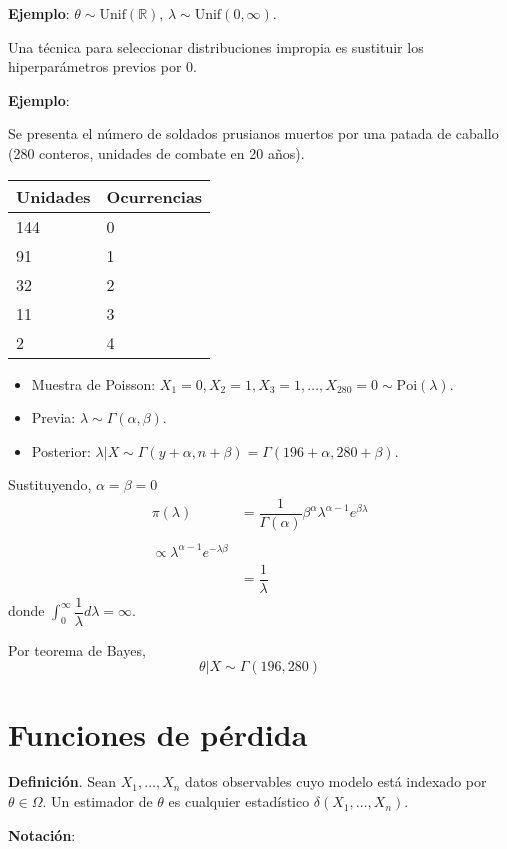 \documentclass[
  12pt,
]{book}
\begin{document}
\textbf{Ejemplo}: \(\theta \sim \text{Unif}(\mathbb{R})\), \(\lambda \sim \text{Unif}(0,\infty)\).

Una técnica para seleccionar distribuciones impropia es sustituir los hiperparámetros previos por 0.

\textbf{Ejemplo}:

Se presenta el número de soldados prusianos muertos por una patada de caballo (280 conteros, unidades de combate en 20 años).

\begin{longtable}[]{@{}ll@{}}
\toprule
Unidades & Ocurrencias\tabularnewline
\midrule
\endhead
144 & 0\tabularnewline
91 & 1\tabularnewline
32 & 2\tabularnewline
11 & 3\tabularnewline
2 & 4\tabularnewline
\bottomrule
\end{longtable}

\begin{itemize}
\item
  Muestra de Poisson: \(X_1 = 0, X_2 = 1, X_3 = 1,\dots, X_{280} = 0 \sim \text{Poi}(\lambda)\).
\item
  Previa: \(\lambda \sim \Gamma(\alpha, \beta)\).
\item
  Posterior: \(\lambda|X \sim \Gamma(y+\alpha, n+\beta) = \Gamma(196 + \alpha, 280 + \beta)\).
\end{itemize}

Sustituyendo, \(\alpha=\beta = 0\)
\begin{align*}
\pi(\lambda) &= \dfrac{1}{\Gamma(\alpha)}\beta^\alpha\lambda^{\alpha-1}e^{\beta\lambda}  \\
\\ \propto \lambda^{\alpha-1}e^{-\lambda\beta} \\
&=\dfrac{1}{\lambda}
\end{align*}
donde \(\displaystyle\int_{0}^{\infty}\dfrac{1}{\lambda} d\lambda = \infty\).

Por teorema de Bayes, \[\theta|X \sim \Gamma(196,280)\]

\hypertarget{funciones-de-puxe9rdida}{%
\section{Funciones de pérdida}\label{funciones-de-puxe9rdida}}

\textbf{Definición}. Sean \(X_1,\dots, X_n\) datos observables cuyo modelo está indexado por \(\theta\in\Omega\). Un estimador de \(\theta\) es cualquier estadístico \(\delta(X_1,\dots, X_n)\).

\textbf{Notación}:
\end{document}
